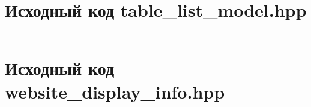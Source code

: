 \documentclass[a4paper, 14pt]{extarticle}
\newenvironment{code}{\captionsetup{type=listing}}{}
\begin{document}
\begin{code}
  \inputminted{cpp}{../task-3/src/website_viewer.cpp}
\end{code}

\newpage

\section{Исходный код table\_list\_model.hpp}
\label{app:table_list_model.hpp}

\begin{code}
  \inputminted{cpp}{../task-3/src/table_list_model.hpp}
\end{code}

\newpage

\section{Исходный код website\_display\_info.hpp}
\label{app:website_display_info.hpp}

\begin{code}
  \inputminted{cpp}{../task-3/src/website_display_info.hpp}
\end{code}
\end{document}
